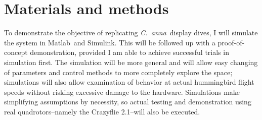 \documentclass[onecolumn,10pt]{IEEEtran}
\newcommand{\Canna}{\emph{C.~anna}}
\newcommand{\MATLAB}{Matlab}
\begin{document}
\section{Materials and methods}
To demonstrate the objective of replicating \Canna\ display dives,  I will simulate the system in \MATLAB\ and Simulink.  This will be followed up with a proof-of-concept demonstration, provided I am able to achieve successful trials in simulation first. The simulation will be more general and will allow easy changing of parameters and control methods to more completely explore the space; simulations will also allow examination of behavior at actual hummingbird flight speeds without risking excessive damage to the hardware. Simulations make simplifying assumptions by necessity, so actual testing and demonstration using real quadrotors--namely the Crazyflie 2.1--will also be executed.  
\end{document}
